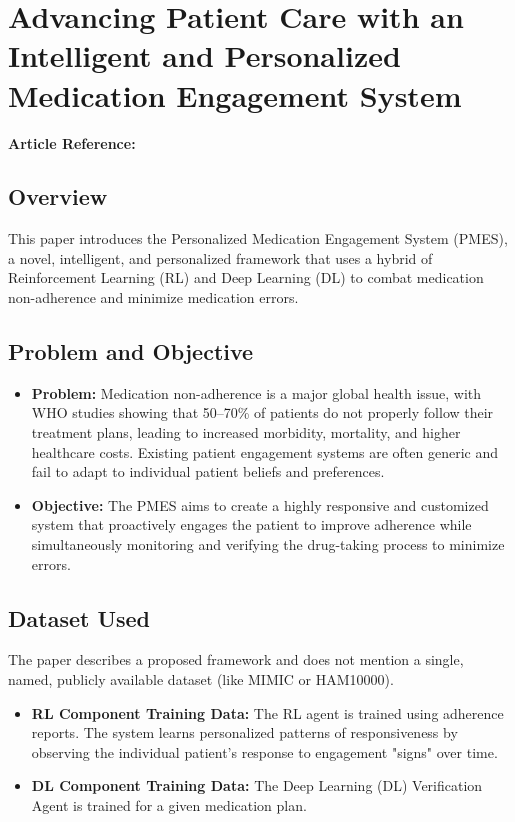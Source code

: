 \section{Advancing Patient Care with an Intelligent and Personalized Medication Engagement System}
\textbf{Article Reference:} \cite{ismailAdvancingPatientCare2024}

\subsection*{Overview}
This paper introduces the Personalized Medication Engagement System (PMES), a novel, intelligent, and personalized framework that uses a hybrid of Reinforcement Learning (RL) and Deep Learning (DL) to combat medication non-adherence and minimize medication errors.

\subsection*{Problem and Objective}
\begin{itemize}
    \item \textbf{Problem:} Medication non-adherence is a major global health issue, with WHO studies showing that 50--70\% of patients do not properly follow their treatment plans, leading to increased morbidity, mortality, and higher healthcare costs. Existing patient engagement systems are often generic and fail to adapt to individual patient beliefs and preferences.
    \item \textbf{Objective:} The PMES aims to create a highly responsive and customized system that proactively engages the patient to improve adherence while simultaneously monitoring and verifying the drug-taking process to minimize errors.
\end{itemize}

\subsection*{Dataset Used}
The paper describes a proposed framework and does not mention a single, named, publicly available dataset (like MIMIC or HAM10000).
\begin{itemize}
    \item \textbf{RL Component Training Data:} The RL agent is trained using adherence reports. The system learns personalized patterns of responsiveness by observing the individual patient's response to engagement "signs" over time.
    \item \textbf{DL Component Training Data:} The Deep Learning (DL) Verification Agent is trained for a given medication plan.
\end{itemize}

